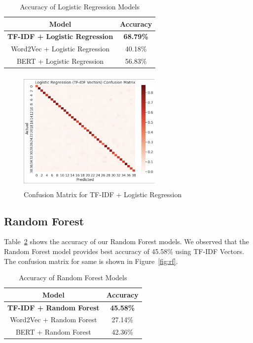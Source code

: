 \documentclass[conference]{IEEEtran}
\begin{document}
\begin{table}[!htb]
\centering
\caption{Accuracy of Logistic Regression Models}
\label{tab: lr_models}
\begin{tabular}{c|c}\midrule\midrule
Model & Accuracy\\ \midrule
\textbf{TF-IDF + Logistic Regression} & \textbf{68.79\%} \\
Word2Vec + Logistic Regression & 40.18\% \\
BERT + Logistic Regression & 56.83\% \\ \midrule\midrule
\end{tabular}
\end{table}

\begin{figure}[!htb]
\centering
\includegraphics[width=70mm, height = 60mm]{Images/Logistic Regression.png}
\caption{Confusion Matrix for TF-IDF + Logistic Regression}\label{fig:lr}
\end{figure}

\subsection{Random Forest}

Table~\ref{tab: rf_models} shows the accuracy of our Random Forest models. We observed that the Random Forest model provides best accuracy of 45.58\% using TF-IDF Vectors. The confusion matrix for same is shown in Figure~\ref{fig:rf}.

\begin{table}[!htb]
\centering
\caption{Accuracy of Random Forest Models}
\label{tab: rf_models}
\begin{tabular}{c|c}\midrule\midrule
Model & Accuracy\\ \midrule
\textbf{TF-IDF + Random Forest} & \textbf{45.58\%} \\
Word2Vec + Random Forest & 27.14\% \\
BERT + Random Forest & 42.36\% \\ \midrule\midrule
\end{tabular}
\end{table}
\end{document}
